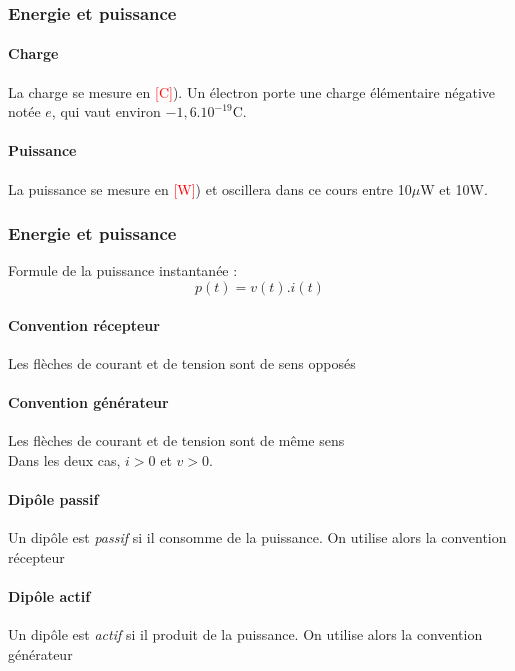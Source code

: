 \documentclass[a4paper]{article}
\begin{document}
    \subsubsection{Energie et puissance}

    \paragraph{Charge} La charge se mesure en \textcolor{red}{[C]}). Un électron
    porte une charge élémentaire négative notée $e$, qui vaut environ $-1,6.10^{-19}$C.

    \paragraph{Puissance} La puissance se mesure en \textcolor{red}{[W]}) et
    oscillera dans ce cours entre 10$\mu$W et 10W.

    \subsubsection{Energie et puissance}
    Formule de la puissance instantanée : $$ p(t) = v(t).i(t) $$

    \paragraph{Convention récepteur} Les flèches de courant et de tension sont
    de sens opposés

    \paragraph{Convention générateur} Les flèches de courant et de tension sont
    de même sens\\

    Dans les deux cas, $i>0$ et $v>0$.

    \paragraph{Dipôle passif} Un dipôle est \textit{passif} si il consomme de la puissance. On utilise alors la convention récepteur

    \paragraph{Dipôle actif} Un dipôle est \textit{actif} si il produit de la puissance. On utilise alors la convention générateur
\end{document}
